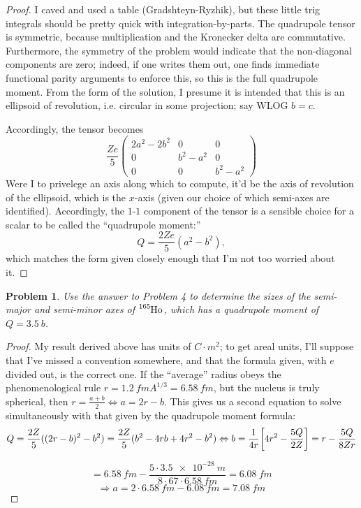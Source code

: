 \documentclass{article}
\newtheorem{plm}{Problem}
\begin{document}
\begin{proof}
  I caved and used a table (Gradshteyn-Ryzhik), but these little trig integrals should be pretty quick with integration-by-parts.
  The quadrupole tensor is symmetric, because multiplication and the Kronecker delta are commutative.
  Furthermore, the symmetry of the problem would indicate that the non-diagonal components are zero;
  indeed, if one writes them out, one finds immediate functional parity arguments to enforce this,
  so this is the full quadrupole moment.
  From the form of the solution, I presume it is intended that this is an ellipsoid of revolution,
  i.e. circular in some projection; say WLOG $b = c$.

  Accordingly, the tensor becomes
  \[
    \frac{Ze}{5}
    \begin{pmatrix}
      2a^{2} - 2b^{2} & 0 & 0 \\
      0 & b^{2} - a^{2} & 0 \\
      0 & 0 & b^{2} - a^{2}
    \end{pmatrix}
  \]
  Were I to privelege an axis along which to compute, it'd be the axis of revolution of the ellipsoid, which is the $x$-axis
  (given our choice of which semi-axes are identified).
  Accordingly, the $1$-$1$ component of the tensor is a sensible choice for a scalar to be called the ``quadrupole moment:''
  \[
    Q = \frac{2Ze}{5}(a^{2} - b^{2}),
  \]
  which matches the form given closely enough that I'm not too worried about it.
\end{proof}

\begin{plm}
  Use the answer to Problem 4 to determine the sizes of the semi-major and semi-minor axes of $\ce{^{165}Ho}$,
  which has a quadrupole moment of $Q = \SI{3.5}{b}$.
\end{plm}

\begin{proof}
  My result derived above has units of $\si{C \cdot m^{2}}$; to get areal units, I'll suppose that I've missed a convention somewhere,
  and that the formula given, with $e$ divided out, is the correct one.
  If the ``average'' radius obeys the phenomenological rule $r = \SI{1.2}{fm} A^{1/3} = \SI{6.58}{fm}$,
  but the nucleus is truly spherical,
  then $r = \frac{a + b}{2} \Leftrightarrow a = 2r - b$.
  This gives us a second equation to solve simultaneously with that given by the quadrupole moment formula:
  \[
    Q = \frac{2Z}{5}((2r - b)^{2} - b^{2}) = \frac{2Z}{5}(b^{2} - 4rb + 4r^{2} - b^{2})
    \Leftrightarrow b = \frac{1}{4r}\qty[4r^{2} - \frac{5Q}{2Z}] = r - \frac{5Q}{8Z r}
  \]

  \[
    = \SI{6.58}{fm} - \frac{5 \cdot \SI{3.5e-28}{m}}{8 \cdot 67 \cdot \SI{6.58}{fm}}
    = \SI{6.08}{fm}
  \]
  \[
    \Rightarrow a = 2 \cdot \SI{6.58}{fm} - \SI{6.08}{fm} = \SI{7.08}{fm}
  \]
\end{proof}
\end{document}
